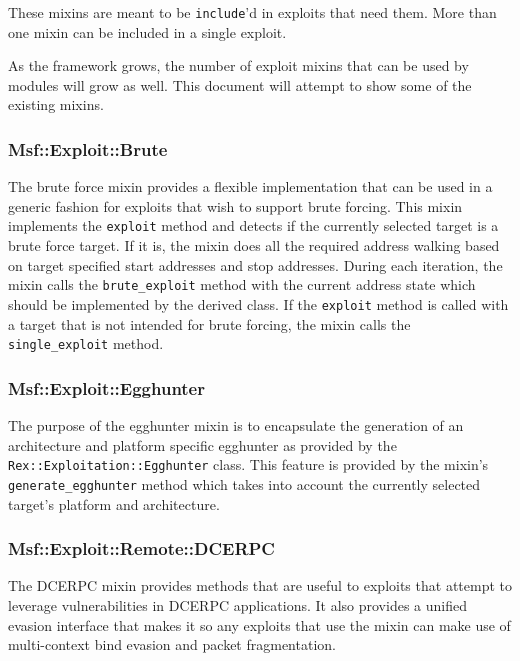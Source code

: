 \documentclass{report}
\begin{document}
\par
These mixins are meant to be \texttt{include}'d in exploits that
need them.  More than one mixin can be included in a single exploit.

\par
As the framework grows, the number of exploit mixins that can be
used by modules will grow as well.  This document will attempt to
show some of the existing mixins.

            \subsubsection{Msf::Exploit::Brute}

\par
The brute force mixin provides a flexible implementation that can be
used in a generic fashion for exploits that wish to support brute
forcing.  This mixin implements the \texttt{exploit} method and
detects if the currently selected target is a brute force target. If
it is, the mixin does all the required address walking based on
target specified start addresses and stop addresses.  During each
iteration, the mixin calls the \texttt{brute\_exploit} method with
the current address state which should be implemented by the derived
class.  If the \texttt{exploit} method is called with a target that
is not intended for brute forcing, the mixin calls the
\texttt{single\_exploit} method.

            \subsubsection{Msf::Exploit::Egghunter}

\par
The purpose of the egghunter mixin is to encapsulate the generation
of an architecture and platform specific egghunter as provided by
the \texttt{Rex::Exploitation::Egghunter} class.  This feature is
provided by the mixin's \texttt{generate\_egghunter} method which
takes into account the currently selected target's platform and
architecture.

            \subsubsection{Msf::Exploit::Remote::DCERPC}

\par
The DCERPC mixin provides methods that are useful to exploits that
attempt to leverage vulnerabilities in DCERPC applications.  It also
provides a unified evasion interface that makes it so any exploits
that use the mixin can make use of multi-context bind evasion and
packet fragmentation.
\end{document}
